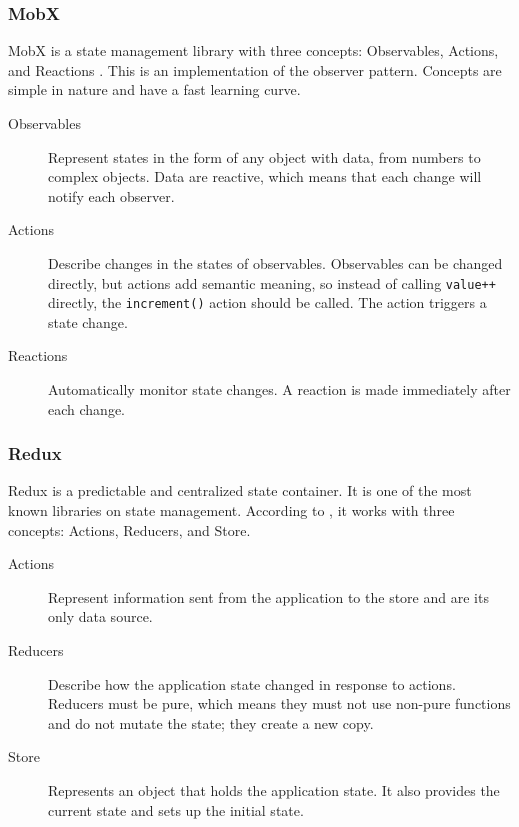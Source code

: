\subsubsection{MobX}

MobX is a state management library with three concepts: Observables, Actions, and Reactions \cite{a2022_mobxdart}.
This is an implementation of the observer pattern.
Concepts are simple in nature and have a fast learning curve.

\begin{description}
    \item[Observables] Represent states in the form of any object with data, from numbers to complex objects.
    Data are reactive, which means that each change will notify each observer.
    \item[Actions] Describe changes in the states of observables. Observables can be changed directly, but actions add semantic meaning, so instead of calling \texttt{value++} directly, the \texttt{increment()} action should be called. The action triggers a state change.
    \item[Reactions] Automatically monitor state changes. A reaction is made immediately after each change.
\end{description}

\subsubsection{Redux}

Redux is a predictable and centralized state container.
It is one of the most known libraries on state management.
According to \cite{brianegan_2021_fluttercommunityreduxdart}, it works with three concepts: Actions, Reducers, and Store.

\begin{description}
    \item[Actions] Represent information sent from the application to the store and are its only data source.
    \item[Reducers] Describe how the application state changed in response to actions.
    Reducers must be pure, which means they must not use non-pure functions and do not mutate the state; they create a new copy.
    \item[Store] Represents an object that holds the application state.
    It also provides the current state and sets up the initial state.
\end{description}

